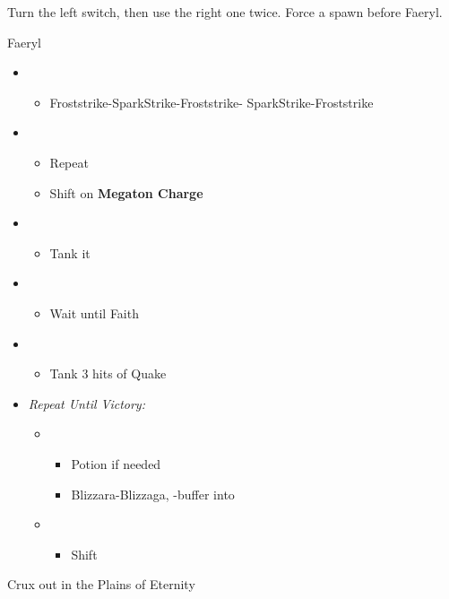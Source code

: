 Turn the left switch, then use the right one twice. Force a spawn before Faeryl.

\begin{battle}{Faeryl}
	\begin{itemize}
		\item \sixth
		      \begin{itemize}
			      \item Froststrike-SparkStrike-Froststrike- SparkStrike-Froststrike
		      \end{itemize}
		\item \fifth
		      \begin{itemize}
			      \item Repeat
			      \item Shift on \textbf{Megaton Charge}
		      \end{itemize}
		\item \fourth
		      \begin{itemize}
			      \item Tank it
		      \end{itemize}
		\item \second
		      \begin{itemize}
			      \item Wait until Faith
		      \end{itemize}
		\item \fourth
		      \begin{itemize}
			      \item Tank 3 hits of Quake
		      \end{itemize}
		\item \textit{Repeat Until Victory:}
		      \begin{itemize}
			      \item \sixth
			            \begin{itemize}
				            \item Potion if needed
				            \item Blizzara-Blizzaga, \com-buffer into
			            \end{itemize}
			      \item \first
			            \begin{itemize}
				            \item Shift
			            \end{itemize}
		      \end{itemize}
	\end{itemize}
\end{battle}


Crux out in the Plains of Eternity